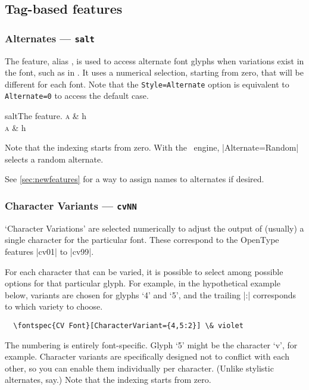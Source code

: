 \documentclass[a4paper]{l3doc}
\begin{document}
\subsection{Tag-based features}


\subsubsection{Alternates --- \texttt{salt}}

The  feature, alias , is used to access alternate font glyphs when variations exist in the font, such as in .
It uses a numerical selection, starting from zero, that will be different for each font.
Note that the \texttt{Style=Alternate} option is equivalent
to \texttt{Alternate=0} to access the default case.

\begin{Xexample}[firstline=2]{salt}{The  feature.}
  \huge
  \textsc{a} \& h \\
  \textsc{a} \& h
\end{Xexample}

Note that the indexing starts from zero.
With the \LuaTeX\ engine, |Alternate=Random| selects a random alternate.

See \vref{sec:newfeatures} for a way to assign names to alternates if desired.


\subsubsection{Character Variants --- \texttt{cvNN}}

`Character Variations' are selected
numerically to adjust the output of (usually) a single character for the
particular font. These correspond to the OpenType features |cv01| to |cv99|.

For each character that can be varied, it is possible to select among
possible options for that particular glyph.
For example, in the hypothetical example below, variants are chosen for glyphs `4' and `5',
and the trailing |:| corresponds to which variety to choose.
\begin{Verbatim}
  \fontspec{CV Font}[CharacterVariant={4,5:2}] \& violet
\end{Verbatim}
The numbering is entirely font-specific. Glyph `5' might be the character `v', for example.
Character variants are specifically designed not to conflict with each
other, so you can enable them individually per character.
(Unlike stylistic alternates, say.)
Note that the indexing starts from zero.
\end{document}
